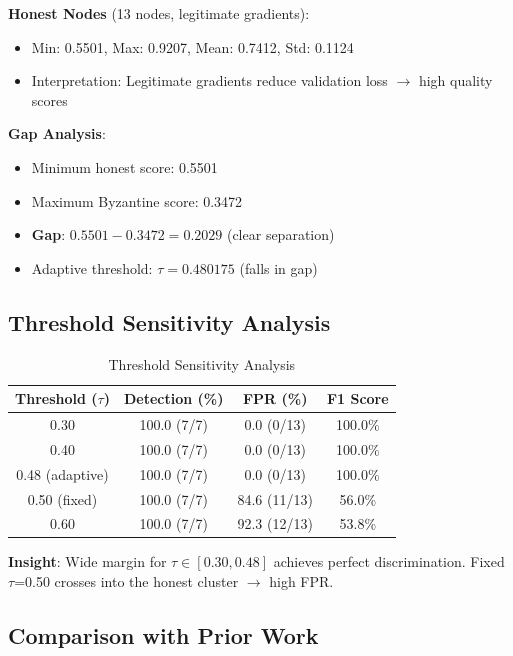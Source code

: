 \textbf{Honest Nodes} (13 nodes, legitimate gradients):
\begin{itemize}
    \item Min: 0.5501, Max: 0.9207, Mean: 0.7412, Std: 0.1124
    \item Interpretation: Legitimate gradients reduce validation loss $\rightarrow$ high quality scores
\end{itemize}

\textbf{Gap Analysis}:
\begin{itemize}
    \item Minimum honest score: 0.5501
    \item Maximum Byzantine score: 0.3472
    \item \textbf{Gap}: $0.5501 - 0.3472 = 0.2029$ (clear separation)
    \item Adaptive threshold: $\tau = 0.480175$ (falls in gap)
\end{itemize}

\subsection{Threshold Sensitivity Analysis}

\begin{table}[h]
\centering
\caption{Threshold Sensitivity Analysis}
\label{tab:threshold_sensitivity}
\begin{tabular}{@{}cccc@{}}
\toprule
\textbf{Threshold ($\tau$)} & \textbf{Detection (\%)} & \textbf{FPR (\%)} & \textbf{F1 Score} \\
\midrule
0.30 & 100.0 (7/7) & 0.0 (0/13) & 100.0\% \\
0.40 & 100.0 (7/7) & 0.0 (0/13) & 100.0\% \\
0.48 (adaptive) & 100.0 (7/7) & 0.0 (0/13) & 100.0\% \\
0.50 (fixed) & 100.0 (7/7) & 84.6 (11/13) & 56.0\% \\
0.60 & 100.0 (7/7) & 92.3 (12/13) & 53.8\% \\
\bottomrule
\end{tabular}
\end{table}

\textbf{Insight}: Wide margin for $\tau \in [0.30, 0.48]$ achieves perfect discrimination. Fixed $\tau$=0.50 crosses into the honest cluster $\rightarrow$ high FPR.

\subsection{Comparison with Prior Work}

